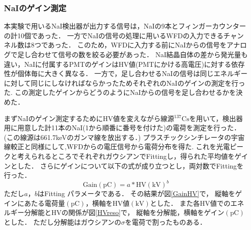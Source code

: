 \subsubsection{NaIのゲイン測定}
本実験で用いるNaI検出器が出力する信号は，NaIの9本とフィンガーカウンターの計10個であった．
一方でNaIの信号の処理に用いるWFDの入力できるチャンネル数は8つであった．
このため，WFDに入力する前にNaIからの信号をアナログで足し合わせて信号の数を絞る必要があった．
NaI結晶自体の差から発光量も違い，NaIに付属するPMTのゲインはHV値(PMTにかける高電圧)に対する依存性が個体毎に大きく異なる．
一方で，足し合わせるNaIの信号は同じエネルギーに対して同じにしなければならかったためそれぞれのNaIのゲインの測定を行った.
この測定したゲインからどうのようにNaIからの信号を足し合わせるかを決めた．

まずNaIのゲイン測定するためにHV値を変えながら線源$^{137}\mathrm{Cs}$を用いて，検出器用に用意した計11本のNaI(1から順番に番号を付けた)の電荷を測定を行った．
(この線源は661.7keVのガンマ線を放出する．\cite{IAEA_ENSDF})
プラスチックシンチレータの宇宙線較正と同様にして,WFDからの電圧信号から電荷分布を得た.
これを光電ピークと考えられるところでそれぞれガウシアンでFittingし，得られた平均値をゲインとした．
さらにゲインについて以下の式が成り立つとし，両対数でFittingを行った．\cite{Hamamatsu_PMT}
\begin{equation}
\mathrm{Gain}(\mathrm{pC})=a*\mathrm{HV}(\mathrm{kV})^b \label{gain_curve}  
\end{equation}
ただし$a， b$はFitting パラメータである．
その結果が図\ref{GainHV}で，
縦軸をゲインにあたる電荷量$(\mathrm{pC})$，横軸をHV値$(\mathrm{kV})$とした．
また各HV値でのエネルギー分解能とHVの関係が図\ref{HVreso}で，
縦軸を分解能，横軸をゲイン$(\mathrm{pC})$とした．
ただし分解能はガウシアンの$\sigma$を電荷で割ったものある．
